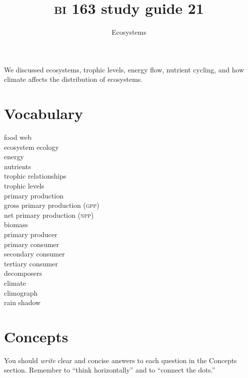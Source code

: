 \documentclass[letterpaper]{tufte-handout}
\title{{\scshape bi} 163 study guide 21}
\author{Ecosystems}
\date{} %
\begin{document}
\maketitle	%

We discussed ecosystems, trophic levels, energy flow, nutrient cycling, and how climate affects the distribution of ecosystems.

\section*{Vocabulary}

\vspace{-1\baselineskip}
\begin{multicols}{2}
food web\\
ecosystem ecology\\
energy \\
nutrients \\
trophic relationships\\
trophic levels\\
primary production\\
gross primary production (\textsc{gpp})\\
net primary production (\textsc{npp})\\
biomass\\
primary producer\\
primary consumer\\
secondary consumer\\
tertiary consumer\\
decomposers\\
climate \\
climograph \\
rain shadow
\end{multicols}

\section*{Concepts}

You should \emph{write} clear and concise answers to each question in the Concepts section.  Remember to ``think horizontally'' and to ``connect the dots.'' 
\end{document}

